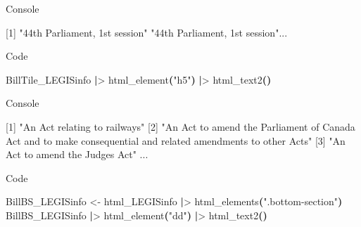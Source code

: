 \documentclass[
  letterpaper,
  DIV=11,
  numbers=noendperiod]{scrreprt}
\newenvironment{Shaded}{\begin{snugshade}}{\end{snugshade}}
\newcommand{\ExtensionTok}[1]{\textcolor[rgb]{0.00,0.23,0.31}{#1}}
\newcommand{\KeywordTok}[1]{\textcolor[rgb]{0.00,0.23,0.31}{\textbf{#1}}}
\newcommand{\NormalTok}[1]{\textcolor[rgb]{0.00,0.23,0.31}{#1}}
\newcommand{\OperatorTok}[1]{\textcolor[rgb]{0.37,0.37,0.37}{#1}}
\newcommand{\StringTok}[1]{\textcolor[rgb]{0.13,0.47,0.30}{#1}}
\begin{document}
Console

\begin{Shaded}
\begin{Highlighting}[]
\ExtensionTok{[1]} \StringTok{"44th Parliament, 1st session"} \StringTok{"44th Parliament, 1st session"}\NormalTok{...}
\end{Highlighting}
\end{Shaded}

Code

\begin{Shaded}
\begin{Highlighting}[]
\ExtensionTok{BillTile\_LEGISinfo} \KeywordTok{|}\OperatorTok{\textgreater{}}\NormalTok{ html\_element}\KeywordTok{(}\StringTok{"h5"}\KeywordTok{)} \KeywordTok{|}\OperatorTok{\textgreater{}}\NormalTok{ html\_text2}\KeywordTok{()}
\end{Highlighting}
\end{Shaded}

Console

\begin{Shaded}
\begin{Highlighting}[]
\ExtensionTok{[1]} \StringTok{"An Act relating to railways"}                                                                                                                                                                                                                                                                                  
 \ExtensionTok{[2]} \StringTok{"An Act to amend the Parliament of Canada Act and to make }
\StringTok{ consequential and related amendments to other Acts"}                                                                                                                                                                                                  
 \ExtensionTok{[3]} \StringTok{"An Act to amend the Judges Act"}   
\ExtensionTok{...}
\end{Highlighting}
\end{Shaded}

Code

\begin{Shaded}
\begin{Highlighting}[]
\ExtensionTok{BillBS\_LEGISinfo} \OperatorTok{\textless{}}\NormalTok{{-} html\_LEGISinfo }\KeywordTok{|}\OperatorTok{\textgreater{}}\NormalTok{ html\_elements}\KeywordTok{(}\StringTok{".bottom{-}section"}\KeywordTok{)}
\ExtensionTok{BillBS\_LEGISinfo} \KeywordTok{|}\OperatorTok{\textgreater{}}\NormalTok{ html\_element}\KeywordTok{(}\StringTok{"dd"}\KeywordTok{)} \KeywordTok{|}\OperatorTok{\textgreater{}}\NormalTok{ html\_text2}\KeywordTok{()}
\end{Highlighting}
\end{Shaded}
\end{document}
